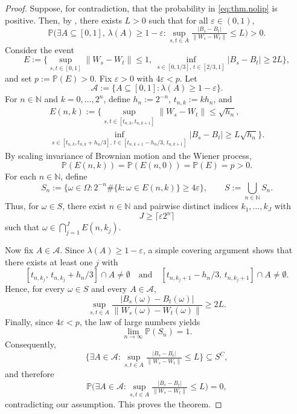 \documentclass[a4paper]{amsart}
\numberwithin{theorem}{section}
\theoremstyle{definition}
\renewcommand{\epsilon}{\varepsilon}
\begin{document}
\begin{proof}
    Suppose, for contradiction, that the probability in \eqref{eq:thm.nolip} is positive. 
    Then, by , there exists $L > 0$ such that for all $\epsilon \in (0,1)$,
    \[
        \mathbb P \Big( \exists A \subseteq [0,1], \, \lambda(A) \ge 1 - \epsilon : \sup_{s,t \in A} \tfrac{|B_s - B_t|}{\|W_s - W_t\|} \le L \Big) > 0.
    \]
    Consider the event
    \[
        E := \Big\{ \sup_{s,t \in [0,1]} \|W_s - W_t\| \le 1, \ \inf_{s \in [0,1/3], \, t \in [2/3,1]} |B_s - B_t| \ge 2L \Big\},
    \]
    and set $p := \mathbb P(E) > 0$. 
    Fix $\epsilon > 0$ with $4 \epsilon < p$.
    Let
    \[
        \mathcal A := \{ A \subseteq [0,1] : \lambda(A) \ge 1 - \epsilon \}.
    \]
    For $n \in \mathbb N$ and $k = 0,\dots,2^n$, define $h_n := 2^{-n}$, $t_{n,k} := k h_n$, and
    \begin{multline*}
        E(n,k) := \Big\{ \sup_{s,t \in [t_{n,k},t_{n,k+1}]} \|W_s - W_t\| \le \sqrt{h_n}, \\
        \inf_{s \in [t_{n,k}, t_{n,k} + h_n/3], \, t \in [t_{n,k+1} - h_n/3, \, t_{n,k+1}]} |B_s - B_t| \ge L \sqrt{h_n} \Big\}.
    \end{multline*}
    By scaling invariance of Brownian motion and the Wiener process,
    \[
        \mathbb P(E(n,k)) = \mathbb P(E(n,0)) = \mathbb P(E) = p > 0.
    \]
    For each $n \in \mathbb N$, define
    \[
        S_n := \Big\{ \omega \in \Omega : 2^{-n} \# \{ k : \omega \in E(n,k) \} \ge 4 \epsilon \Big\},
    \qquad 
        S := \bigcup_{n \in \mathbb N} S_n.
    \]
    Thus, for $\omega \in S$, there exist $n \in \mathbb N$ and pairwise distinct indices $k_1,\dots,k_J$ with 
    \[
        J \ge \lceil \epsilon 2^n \rceil
    \]
    such that $\omega \in \bigcap_{j=1}^J E(n,k_j)$.

    Now fix $A \in \mathcal A$. 
    Since $\lambda(A) \ge 1 - \epsilon$, a simple covering argument shows that there exists at least one $j$ with
    \[
        [t_{n,k_j}, \, t_{n,k_j} + h_n/3] \cap A \neq \emptyset 
        \quad \text{and} \quad
        [t_{n,k_j+1} - h_n/3, \, t_{n,k_j+1}] \cap A \neq \emptyset.
    \]
    Hence, for every $\omega \in S$ and every $A \in \mathcal A$,
    \[
        \sup_{s,t \in A} \frac{|B_s(\omega) - B_t(\omega)|}{\|W_s(\omega) - W_t(\omega)\|} \ge 2L.
    \]
    Finally, since $4\epsilon < p$, the law of large numbers yields
    \[
        \lim_{n \to \infty} \mathbb P(S_n) = 1.
    \]
    Consequently,
    \[
        \Big\{ \exists A \in \mathcal A : \sup_{s,t \in A} \tfrac{|B_s - B_t|}{\|W_s - W_t\|} \le L \Big\} \subseteq S^C,
    \]
    and therefore
    \[
        \mathbb P\Big( \exists A \in \mathcal A : \sup_{s,t \in A} \tfrac{|B_s - B_t|}{\|W_s - W_t\|} \le L \Big) = 0,
    \]
    contradicting our assumption. 
    This proves the theorem.
\end{proof}
\end{document}
